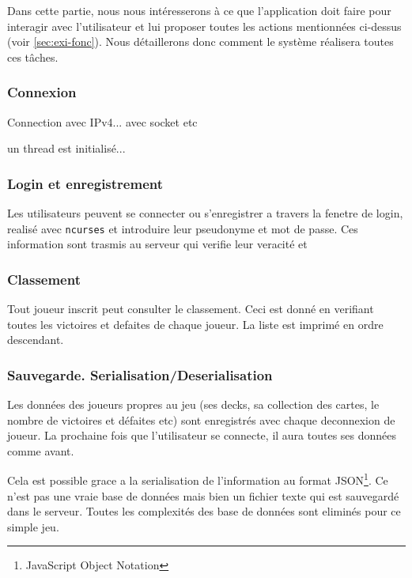 \documentclass[11pt,a4paper]{article}
\begin{document}
Dans cette partie, nous nous intéresserons à ce que l'application doit
faire pour interagir avec l'utilisateur et lui proposer toutes les
actions mentionnées ci-dessus (voir \ref{sec:exi-fonc}). Nous détaillerons
donc comment le système réalisera toutes ces tâches.

\subsubsection*{Connexion}

Connection avec IPv4... avec socket etc

un thread est initialisé...

\subsubsection*{Login et enregistrement}

Les utilisateurs peuvent se connecter ou s'enregistrer a travers la
fenetre de login, realisé avec \texttt{ncurses} et introduire leur
pseudonyme et mot de passe. Ces information sont trasmis au serveur
qui verifie leur veracité et

\subsubsection*{Classement}

Tout joueur inscrit peut consulter le classement. Ceci est donné en
verifiant toutes les victoires et defaites de chaque joueur. La liste
est imprimé en ordre descendant.

\subsubsection*{Sauvegarde. Serialisation/Deserialisation}

Les données des joueurs propres au jeu (ses decks,
sa collection des cartes, le nombre de victoires et défaites etc) sont
enregistrés avec chaque deconnexion de joueur. La prochaine fois que
l'utilisateur se connecte, il aura toutes ses données comme avant.

Cela est possible grace a la serialisation de l'information au format
JSON\footnote{JavaScript Object Notation}. Ce n'est pas une vraie base
de données mais bien un fichier texte qui est sauvegardé dans le
serveur. Toutes les complexités des base de données sont eliminés pour
ce simple jeu.
\end{document}
